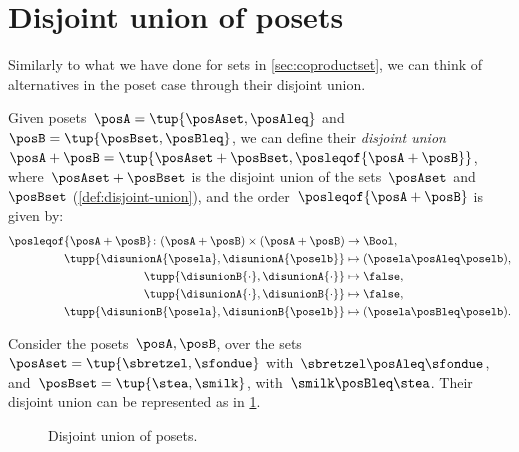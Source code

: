 
\section{Disjoint union of posets}
Similarly to what we have done for sets in \cref{sec:coproductset}, we can think of alternatives in the poset case through their disjoint union.

\begin{definition}
	Given posets~$\posA=\tup{\posAset, \posAleq}$ and~$\posB=\tup{\posBset, \posBleq}$, we can define their \emph{disjoint union}~$\posA+\posB=\tup{\posAset + \posBset, \posleqof{\posA + \posB}}$, where~$\posAset + \posBset$ is the disjoint union of the sets~$\posAset$ and~$\posBset$ (\cref{def:disjoint-union}), and the order~$\posleqof{\posA + \posB}$ is given by:
	\begin{equation}
		\begin{aligned}
			\posleqof{\posA+\posB}\colon (\posA+\posB)\times (\posA+\posB) & \to \Bool, \\
			\tupp{\disunionA{\posela},\disunionA{\poselb} }                &
			\mapsto (\posela\posAleq \poselb),                                          \\
			\tupp{\disunionB{\cdot},\disunionA{\cdot} }                    &
			\mapsto \false,                                                             \\
			\tupp{\disunionA{\cdot},\disunionB{\cdot}}                     &
			\mapsto \false,                                                             \\
			\tupp{\disunionB{\posela},\disunionB{\poselb}}                 &
			\mapsto (\posela\posBleq \poselb).
		\end{aligned}
	\end{equation}
\end{definition}

\begin{example}
	Consider the posets~$\posA,\posB$, over the sets~$\posAset=\tup{\sbretzel, \sfondue}$ with~$\sbretzel \posAleq \sfondue$, and~$\posBset=\tup{\stea,\smilk}$, with~$\smilk \posBleq \stea$.
	Their disjoint union can be represented as in \cref{fig:poset-coproduct}.

	\begin{figure}[h!]
		\centering
		\caption{Disjoint union of posets.}
		\label{fig:poset-coproduct}
	\end{figure}
\end{example}

